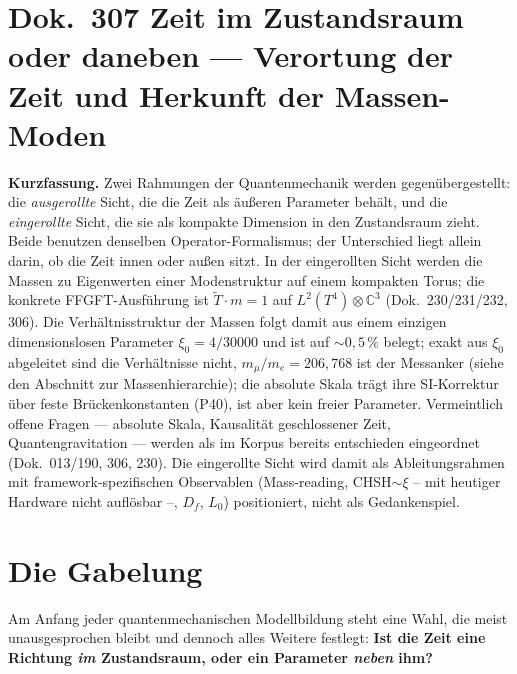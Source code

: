 \section*{Dok.~307 \quad Zeit im Zustandsraum oder daneben --- Verortung der Zeit und Herkunft der Massen-Moden}

\begingroup\small\noindent
\textbf{Kurzfassung.} Zwei Rahmungen der Quantenmechanik werden gegen\"ubergestellt: die \emph{ausgerollte} Sicht, die die Zeit als \"au\ss{}eren Parameter beh\"alt, und die \emph{eingerollte} Sicht, die sie als kompakte Dimension in den Zustandsraum zieht. Beide benutzen denselben Operator-Formalismus; der Unterschied liegt allein darin, ob die Zeit innen oder au\ss{}en sitzt. In der eingerollten Sicht werden die Massen zu Eigenwerten einer Modenstruktur auf einem kompakten Torus; die konkrete FFGFT-Ausf\"uhrung ist $\tilde T\cdot m = 1$ auf $L^2(T^4)\otimes\mathbb{C}^3$ (Dok.~230/231/232, 306). Die Verh\"altnisstruktur der Massen folgt damit aus einem einzigen dimensionslosen Parameter $\xi_0 = 4/30000$ und ist auf ${\sim}0{,}5\,\%$ belegt; exakt aus $\xi_0$ abgeleitet sind die Verh\"altnisse nicht, $m_\mu/m_e = 206{,}768$ ist der Messanker (siehe den Abschnitt zur Massenhierarchie); die absolute Skala tr\"agt ihre SI-Korrektur \"uber feste Br\"uckenkonstanten (P40), ist aber kein freier Parameter. Vermeintlich offene Fragen --- absolute Skala, Kausalit\"at geschlossener Zeit, Quantengravitation --- werden als im Korpus bereits entschieden eingeordnet (Dok.~013/190, 306, 230). Die eingerollte Sicht wird damit als Ableitungsrahmen mit framework-spezifischen Observablen (Mass-reading, CHSH$\sim\xi$ -- mit heutiger Hardware nicht auflösbar --, $D_f$, $L_0$) positioniert, nicht als Gedankenspiel.
\par\endgroup

\medskip

\section{Die Gabelung}

Am Anfang jeder quantenmechanischen Modellbildung steht eine Wahl, die meist unausgesprochen bleibt und dennoch alles Weitere festlegt: \textbf{Ist die Zeit eine Richtung \emph{im} Zustandsraum, oder ein Parameter \emph{neben} ihm?}

